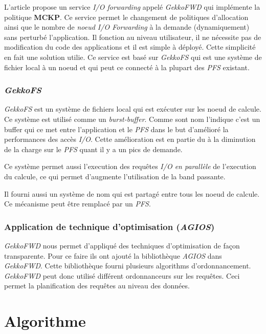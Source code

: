 \documentclass[10pt, a4paper]{article}
\begin{document}
L'article propose un service \emph{I/O forwarding} appelé \emph{GekkoFWD} qui
implémente la politique \textbf{MCKP}. Ce service permet le changement de politiques d'allocation ainsi que le nombre de \emph{noeud I/O Forwarding} à la demande (dynamiquement) sans perturbé l'application. Il fonction au niveau utilisateur, il ne nécessite pas de modification du code des applications et il est simple à déployé. Cette simplicité en fait une solution utilie.
Ce service est basé sur \emph{GekkoFS} qui est une système de fichier local à un noeud et qui peut ce connecté à la plupart des \emph{PFS} existant.

\subsubsection{\emph{GekkoFS}}

\emph{GekkoFS} est un système de fichiers local qui est exécuter sur les noeud de calcule. Ce système est utilisé comme un \emph{burst-buffer}. Comme sont nom l'indique c'est un buffer qui ce met entre l'application et le \emph{PFS} dans le but d'amélioré la performances des accès \emph{I/O}. Cette amélioration est en partie du à la diminution de la charge sur le \emph{PFS} quant il y a un pics de demande.

Ce système permet aussi l'execution des requêtes \emph{I/O en parallèle} de l'execution du calcule, ce qui permet d'augmente l'utilisation de la band passante.

Il fourni aussi un système de nom qui est partagé entre tous les noeud de calcule. Ce mécanisme peut être remplacé par un \emph{PFS}.

\subsubsection{Application de technique d'optimisation (\emph{AGIOS})}

\emph{GekkoFWD} nous permet d'appliqué des techniques d'optimisation de façon transparente. Pour ce faire ils ont ajouté la bibliothèque \emph{AGIOS} dans \emph{GekkoFWD}. Cette bibliothèque fourni plusieurs algorithms d'ordonnancement.
\emph{GekkoFWD} peut donc utilisé différent ordonnanceurs sur les requêtes. Ceci permet la planification des requêtes au niveau des données.

\section{Algorithme}
\end{document}
